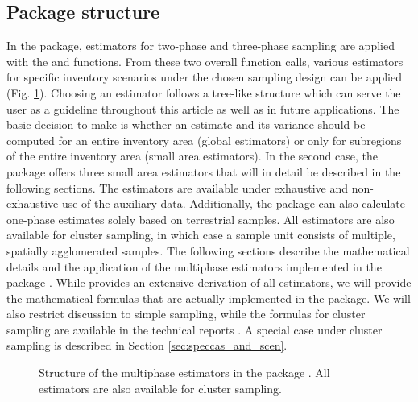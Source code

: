 \documentclass[article]{jss}
\begin{document}

\subsection{Package structure}
\label{sec:packstruc}

In the  package, estimators for two-phase and three-phase sampling are applied with the  and  functions. From these two overall function calls, various estimators for specific inventory scenarios under the chosen sampling design can be applied (Fig. \ref{fig:struct_package}). Choosing an estimator follows a tree-like structure which can serve the user as a guideline throughout this article as well as in future applications. The basic decision to make is whether an estimate and its variance should be computed for an entire inventory area (global estimators) or only for subregions of the entire inventory area (small area estimators). In the second case, the package offers three small area estimators that will in detail be described in the following sections. The estimators are available under exhaustive and non-exhaustive use of the auxiliary data. Additionally, the package can also calculate one-phase estimates solely based on terrestrial samples. All estimators are also available for cluster sampling, in which case a sample unit consists of multiple, spatially agglomerated samples. The following sections describe the mathematical details and the application of the multiphase estimators implemented in the  package . While \cite{mandallaz2008, mandallaz2013techa, mandallaz2013techb,mandallaz2015tech} provides an extensive derivation of all estimators, we will provide the mathematical formulas that are actually implemented in the package. We will also restrict discussion to simple sampling, while the formulas for cluster sampling are available in the technical reports \citep{mandallaz2016, mandallaz2013techa, mandallaz2013techb}. A special case under cluster sampling is described in Section \ref{sec:speccas_and_scen}.

\begin{figure}[htb]
\centering
{}
\caption{Structure of the multiphase estimators in the  package . All estimators are also available for cluster sampling.}
\label{fig:struct_package}
\end{figure}
\end{document}
